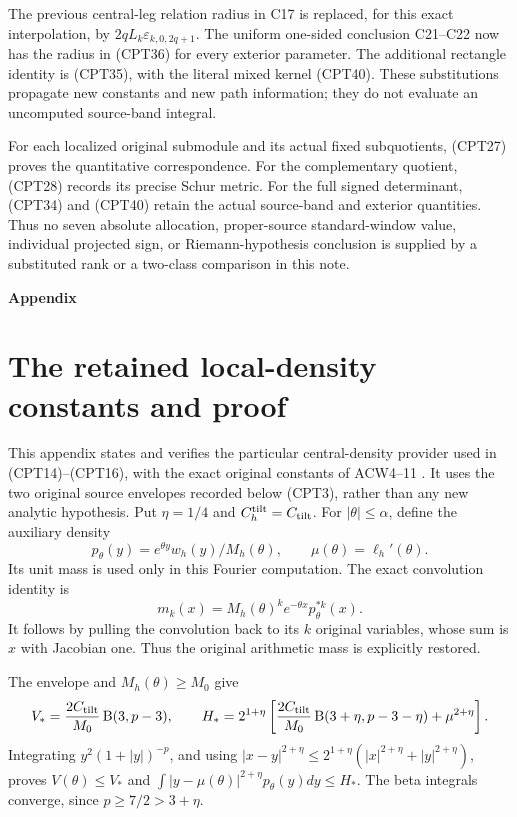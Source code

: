 The previous central-leg relation radius in C17 is replaced,
for this exact interpolation, by \(2qL_k\varepsilon_{k,0,2q+1}\).
The uniform one-sided conclusion C21--C22 now has the radius
in (CPT36) for every exterior parameter.
The additional rectangle identity is (CPT35), with the
literal mixed kernel (CPT40).  These substitutions propagate
new constants and new path information; they do not evaluate
an uncomputed source-band integral.

For each localized original submodule and its actual fixed
subquotients, (CPT27) proves the quantitative correspondence.
For the complementary quotient, (CPT28) records its precise
Schur metric.  For the full signed determinant, (CPT34) and
(CPT40) retain the actual source-band and exterior quantities.
Thus no seven absolute allocation, proper-source
standard-window value, individual projected sign, or
Riemann-hypothesis conclusion is supplied by a substituted
rank or a two-class comparison in this note.

\par\bigskip\noindent\textbf{Appendix}\par
\section{The retained local-density constants and proof}

This appendix states and verifies the particular central-density
provider used in (CPT14)--(CPT16), with the exact original constants
of ACW4--11 \cite{cpt:centralProvider}.  It uses the two original
source envelopes recorded below (CPT3), rather than any new
analytic hypothesis.
Put \(\eta=1/4\) and \(C_h^{\rm tilt}=C_{\rm tilt}\).
For \(|\theta|\le\alpha\), define the auxiliary density
\[
 p_\theta(y)=e^{\theta y}w_h(y)/M_h(\theta),\qquad
 \mu(\theta)=\ell_h'(\theta).
\]
Its unit mass is used only in this Fourier computation.  The
exact convolution identity is
\begin{equation}\tag{CPT41}
 m_k(x)=M_h(\theta)^k e^{-\theta x}p_\theta^{*k}(x).
\end{equation}
It follows by pulling the convolution back to its \(k\)
original variables, whose sum is \(x\) with Jacobian one.
Thus the original arithmetic mass is explicitly restored.

The envelope and \(M_h(\theta)\ge M_0\) give
\[
 V_*=\frac{2C_{\rm tilt}}{M_0}\operatorname B(3,p-3),
 \qquad
 H_*=
 2^{1+\eta}\left[
 \frac{2C_{\rm tilt}}{M_0}\operatorname B(3+\eta,p-3-\eta)
                      +\mu^{2+\eta}\right].
\]
Integrating \(y^2(1+|y|)^{-p}\), and using
\(|x-y|^{2+\eta}\le2^{1+\eta}(|x|^{2+\eta}+|y|^{2+\eta})\),
proves \(V(\theta)\le V_*\) and
\(\int|y-\mu(\theta)|^{2+\eta}p_\theta(y)dy\le H_*\).
The beta integrals converge, since \(p\ge7/2>3+\eta\).

